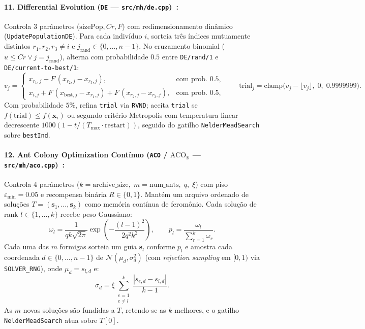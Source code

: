 \documentclass[11pt,a4paper]{article}
\begin{document}
\paragraph{11. Differential Evolution (\texttt{DE} --- \texttt{src/mh/de.cpp})~\cite{storn1997de}:}
Controla 3 parâmetros ($\text{sizePop}, Cr, F$) com redimensionamento dinâmico (\texttt{UpdatePopulationDE}). Para cada indivíduo $i$, sorteia três índices mutuamente distintos $r_1, r_2, r_3 \ne i$ e $j_{\text{rand}} \in \{0, \dots, n-1\}$. No cruzamento binomial ($u \le Cr \lor j = j_{\text{rand}}$), alterna com probabilidade $0.5$ entre \texttt{DE/rand/1} e \texttt{DE/current-to-best/1}:
\begin{equation}
  v_j =
  \begin{cases}
    x_{r_1,j} + F\,(x_{r_2,j} - x_{r_3,j}), & \text{com prob. } 0.5, \\[4pt]
    x_{i,j} + F\,(x_{\text{best},j} - x_{r_1,j}) + F\,(x_{r_2,j} - x_{r_3,j}), & \text{com prob. } 0.5,
  \end{cases}
  \qquad
  \text{trial}_j = \text{clamp}\big(v_j - \lfloor v_j \rfloor,\; 0,\; 0.9999999\big).
  \label{eq:de_mut}
\end{equation}
Com probabilidade $5\%$, refina \texttt{trial} via \texttt{RVND}; aceita \texttt{trial} se $f(\text{trial}) \le f(\mathbf{x}_i)$ ou segundo critério Metropolis com temperatura linear decrescente $1000(1 - t/(T_{\max}\cdot\text{restart}))$, seguido do gatilho \texttt{NelderMeadSearch} sobre \texttt{bestInd}.

\paragraph{12. Ant Colony Optimization Contínuo (\texttt{ACO} / $\text{ACO}_{\mathbb{R}}$ --- \texttt{src/mh/aco.cpp})~\cite{socha2008acor}:}
Controla 4 parâmetros ($k = \text{archive\_size},\; m = \text{num\_ants},\; q,\; \xi$) com piso $\varepsilon_{\min} = 0.05$ e recompensa binária $R \in \{0,1\}$. Mantém um arquivo ordenado de soluções $T = (\mathbf{s}_1, \dots, \mathbf{s}_k)$ como memória contínua de feromônio. Cada solução de rank $l \in \{1,\dots,k\}$ recebe peso Gaussiano:
\begin{equation}
  \omega_l = \frac{1}{q k \sqrt{2\pi}} \exp\!\left(-\frac{(l-1)^2}{2 q^2 k^2}\right),
  \qquad
  p_l = \frac{\omega_l}{\sum_{r=1}^{k} \omega_r}.
\end{equation}
Cada uma das $m$ formigas sorteia um guia $\mathbf{s}_l$ conforme $p_l$ e amostra cada coordenada $d \in \{0,\dots,n-1\}$ de $\mathcal{N}(\mu_d, \sigma_d^2)$ (com \emph{rejection sampling} em $[0,1)$ via \texttt{SOLVER\_RNG}), onde $\mu_d = s_{l,d}$ e:
\begin{equation}
  \sigma_d = \xi \sum_{\substack{e=1 \\ e \ne l}}^{k} \frac{|s_{e,d} - s_{l,d}|}{k - 1}.
\end{equation}
As $m$ novas soluções são fundidas a $T$, retendo-se as $k$ melhores, e o gatilho \texttt{NelderMeadSearch} atua sobre $T[0]$.
\end{document}
